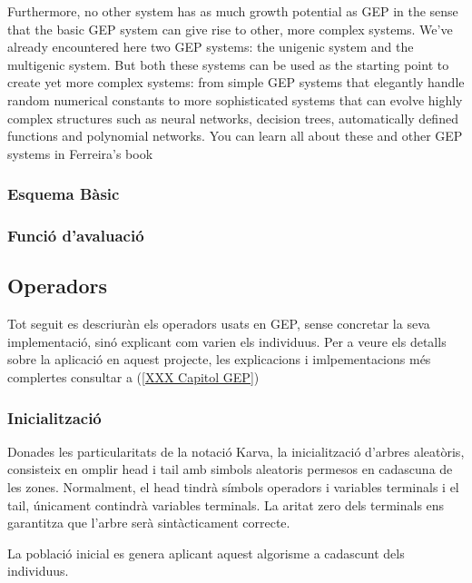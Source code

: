Furthermore, no other system has as much growth potential as GEP in the sense that the basic GEP system can give rise to other, more complex systems. We've already encountered here two GEP systems: the unigenic system and the multigenic system. But both these systems can be used as the starting point to create yet more complex systems: from simple GEP systems that elegantly handle random numerical constants to more sophisticated systems that can evolve highly complex structures such as neural networks, decision trees, automatically defined functions and polynomial networks. You can learn all about these and other GEP systems in Ferreira's book

\subsubsection{Esquema Bàsic} %
\label{ssub:Esquema Basic}

\subsubsection{Funció d'avaluació} %
\label{ssub:funcio d'avaluacio}

\subsection{Operadors} %
\label{sub:Operadors}

Tot seguit es descriuràn els operadors usats en GEP, sense concretar la seva
implementació, sinó explicant com varien els individuus.  Per a veure els
detalls sobre la aplicació en aquest projecte, les explicacions i
imlpementacions més complertes consultar a (\ref{XXX Capitol GEP})

\subsubsection{Inicialització} %
\label{ssub:Inicialitzacio}
Donades les particularitats de la notació Karva, la inicialització d'arbres
aleatòris, consisteix en omplir head i tail amb simbols aleatoris permesos en
cadascuna de les zones.  Normalment, el head tindrà símbols operadors i
variables terminals i el tail, únicament contindrà variables terminals.  La
aritat zero dels terminals ens garantitza que l'arbre serà sintàcticament
correcte.

La població inicial es genera aplicant aquest algorisme a cadascunt dels
individuus.

